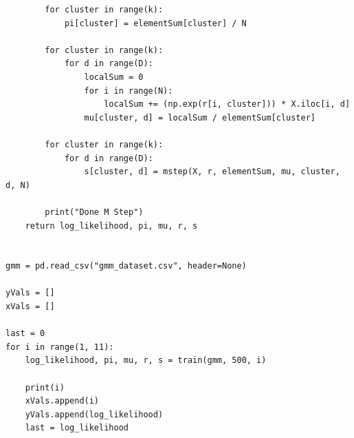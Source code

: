 \documentclass{article}
\begin{document}
\begin{titlepage}
\begin{lstlisting}
        for cluster in range(k):
            pi[cluster] = elementSum[cluster] / N

        for cluster in range(k):
            for d in range(D):
                localSum = 0
                for i in range(N):
                    localSum += (np.exp(r[i, cluster])) * X.iloc[i, d]
                mu[cluster, d] = localSum / elementSum[cluster]

        for cluster in range(k):
            for d in range(D):
                s[cluster, d] = mstep(X, r, elementSum, mu, cluster, d, N)

        print("Done M Step")
    return log_likelihood, pi, mu, r, s


gmm = pd.read_csv("gmm_dataset.csv", header=None)

yVals = []
xVals = []

last = 0
for i in range(1, 11):
    log_likelihood, pi, mu, r, s = train(gmm, 500, i)

    print(i)
    xVals.append(i)
    yVals.append(log_likelihood)
    last = log_likelihood



\end{lstlisting}
\end{titlepage}
\end{document}
